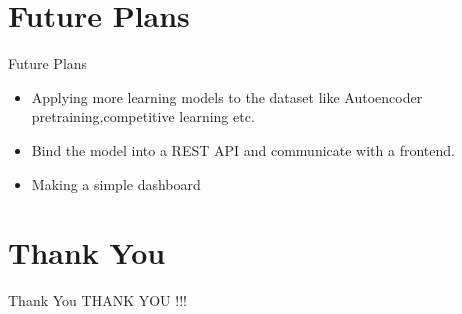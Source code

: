 \documentclass[10pt, a4paper]{beamer}
\begin{document}
\section{Future Plans}
\begin{frame}{Future Plans}
	\begin{itemize}
		\item Applying more learning models to the dataset like Autoencoder pretraining,competitive learning etc.
		\item Bind the model into a REST API and communicate with a frontend.
		\item Making a simple dashboard
	\end{itemize}
\end{frame}


\section{Thank You}
\begin{frame}{Thank You}
	\centering THANK YOU !!!
\end{frame}
\end{document}
